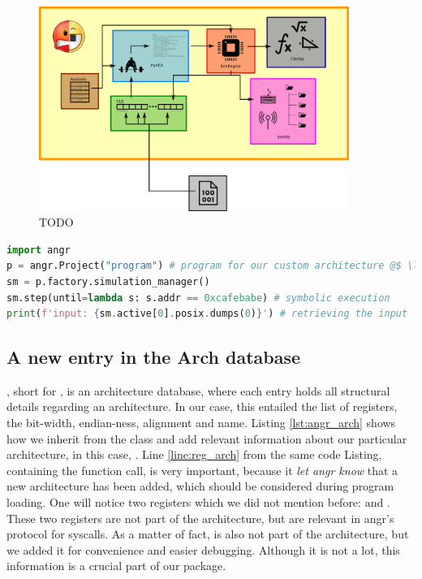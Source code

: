 \begin{figure}
    \centering
    \includegraphics[width=0.9\textwidth]{./images/angr.png}
    \caption{TODO}
    \label{fig:angr}
\end{figure}

\begin{lstlisting}[language=python, label={lst:angr_ex}, caption={A minimal angr code sample. We load a program into \cc{p}, create a simulation manager, symbolically execute the program until we reach the desired address \cc{0xcafebabe}, and finally print the input which determined this execution path.}]
import angr
p = angr.Project("program") # program for our custom architecture @$ \label{line:project} $@
sm = p.factory.simulation_manager()
sm.step(until=lambda s: s.addr == 0xcafebabe) # symbolic execution
print(f'input: {sm.active[0].posix.dumps(0)}') # retrieving the input
\end{lstlisting}

\subsection{A new entry in the Arch database}

, short for , is an architecture database, where each entry holds all structural details regarding an architecture. In our case, this entailed the list of registers, the bit-width, endian-ness, alignment and name. Listing \ref{lst:angr_arch} shows how we inherit from the  class and add relevant information about our particular architecture, in this case, . Line \ref{line:reg_arch} from the same code Listing, containing the  function call, is very important, because it \emph{let angr know} that a new architecture has been added, which should be considered during program loading. One will notice two registers which we did not mention before:  and . These two registers are not part of the architecture, but are relevant in angr's protocol for \glspl{syscall}. As a matter of fact,  is also not part of the architecture, but we added it for convenience and easier debugging. Although it is not a lot, this information is a crucial part of our package.

